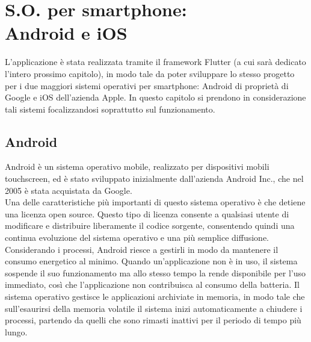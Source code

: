 \chapter{S.O. per smartphone:\\Android e iOS}
L'applicazione è stata realizzata tramite il framework Flutter (a cui sarà
dedicato l'intero prossimo capitolo), in modo tale da poter sviluppare lo stesso
progetto per i due maggiori sistemi operativi per smartphone: Android di
proprietà di Google e iOS dell'azienda Apple. In questo capitolo si prendono in
considerazione tali sistemi focalizzandosi soprattutto sul funzionamento.

\section{Android}
Android è un sistema operativo mobile, realizzato per dispositivi mobili
touchscreen, ed è stato sviluppato inizialmente dall'azienda Android Inc., che
nel 2005 è stata acquistata da Google.\\
Una delle caratteristiche più importanti di questo sistema operativo è che
detiene una licenza open source. Questo tipo di licenza consente a
qualsiasi utente di modificare e distribuire liberamente il codice
sorgente, consentendo quindi una continua evoluzione del sistema operativo e una
più semplice diffusione. Considerando i processi, Android riesce a gestirli in
modo da mantenere il consumo energetico al minimo. Quando un’applicazione non è
in uso, il sistema sospende il suo funzionamento ma allo stesso tempo la rende
disponibile per l’uso immediato, così che l’applicazione non contribuisca
al consumo della batteria. Il sistema operativo gestisce le applicazioni archiviate in
memoria, in modo tale che sull'esaurirsi della memoria volatile il sistema inizi
automaticamente a chiudere i processi, partendo da quelli che sono rimasti
inattivi per il periodo di tempo più lungo.

